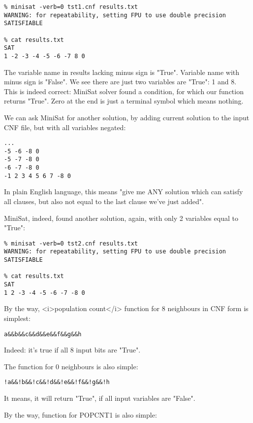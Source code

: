 \begin{lstlisting}
% minisat -verb=0 tst1.cnf results.txt
WARNING: for repeatability, setting FPU to use double precision
SATISFIABLE

% cat results.txt
SAT
1 -2 -3 -4 -5 -6 -7 8 0
\end{lstlisting}

The variable name in results lacking minus sign is "True".
Variable name with minus sign is "False".
We see there are just two variables are "True": 1 and 8.
This is indeed correct: MiniSat solver found a condition, for which our function returns "True".
Zero at the end is just a terminal symbol which means nothing.

We can ask MiniSat for another solution, by adding current solution to the input CNF file, but with all variables negated:

\begin{lstlisting}
...
-5 -6 -8 0
-5 -7 -8 0
-6 -7 -8 0
-1 2 3 4 5 6 7 -8 0
\end{lstlisting}

In plain English language, this means "give me ANY solution which can satisfy all clauses, but also not equal to the last clause we've just added".

MiniSat, indeed, found another solution, again, with only 2 variables equal to "True":

\begin{lstlisting}
% minisat -verb=0 tst2.cnf results.txt
WARNING: for repeatability, setting FPU to use double precision
SATISFIABLE

% cat results.txt
SAT
1 2 -3 -4 -5 -6 -7 -8 0
\end{lstlisting}

By the way, <i>population count</i> function for 8 neighbours in CNF form is simplest:

\begin{lstlisting}
a&&b&&c&&d&&e&&f&&g&&h
\end{lstlisting}

Indeed: it's true if all 8 input bits are "True".

The function for 0 neighbours is also simple:

\begin{lstlisting}
!a&&!b&&!c&&!d&&!e&&!f&&!g&&!h
\end{lstlisting}

It means, it will return "True", if all input variables are "False".

By the way, function for POPCNT1 is also simple:

